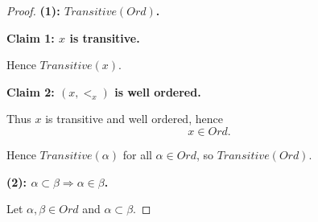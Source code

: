 \documentclass[10pt,a4paper]{book}
\begin{document}
\begin{proof}

    \textbf{ (1): $Transitive(Ord)$.}

    \textbf{Claim 1: $x$ is transitive.}

    \begin{fitchproof}[arrayenv=tabular]

         
         
         
         
         
         

    \end{fitchproof}

    Hence $Transitive(x)$.

    \medskip

    \textbf{Claim 2: $(x,<_x)$ is well ordered.}

    \begin{fitchproof}[arrayenv=tabular]

         
         
         
         

    \end{fitchproof}

    Thus $x$ is transitive and well ordered, hence
    \[
        x \in Ord.
    \]

    \begin{fitchproof}[arrayenv=tabular]


    \end{fitchproof}

    Hence $Transitive(\alpha)$ for all $\alpha \in Ord$, so $Transitive(Ord)$.

    \medskip

    \textbf{(2): $\alpha \subset \beta \Rightarrow \alpha \in \beta$.}

    Let $\alpha,\beta \in Ord$ and $\alpha \subset \beta$.


\end{proof}
\end{document}

